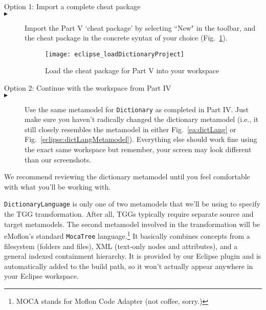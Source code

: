 \vspace{0.5cm}

\begin{description}

\item[Option 1: Import a complete cheat package]

\item[$\blacktriangleright$] \hspace{0.3cm} Import the Part V `cheat package' by selecting ``New" in the toolbar, and the cheat package in the concrete syntax
of your choice (Fig.~\ref{eclipse_cheatPackage}).

\begin{figure}[htbp]
\begin{center}
  \texttt{[image: eclipse\_loadDictionaryProject]}
  \caption{Load the cheat package for Part V into your workspace}
  \label{eclipse_cheatPackage}
\end{center}
\end{figure}

\vspace{0.5cm}

\item[Option 2: Continue with the workspace from Part IV]


\item[$\blacktriangleright$] \hspace{0.3cm} Use the same metamodel for \texttt{Dictionary} as completed in Part IV. Just make sure you haven't radically changed
the dictionary metamodel (i.e., it still closely resembles the metamodel in either Fig.~\ref{ea:dictLang} or Fig.~\ref{eclipse:dictLangMetamodel}). Everything
else should work fine using the exact same workspace but remember, your screen may look different than our screenshots.

\end{description}


We recommend reviewing the dictionary metamodel until you feel comfortable with what you'll be working with. 

\newpage

\texttt{DictionaryLanguage} is only one of two metamodels that we'll be using to specify the TGG transformation. After all, TGGs typically require separate
source and target metamodels. The second metamodel involved in the transformation will be eMoflon's standard \texttt{MocaTree} language.\footnote{MOCA stands
for Moflon Code Adapter (not coffee, sorry.)} It basically combines concepts from a filesystem (folders and files), XML (text-only nodes and attributes), and a
general indexed containment hierarchy. It is provided by our Eclipse plugin and is automatically added to the build path, so it won't actually appear
anywhere in your Eclipse workspace.

